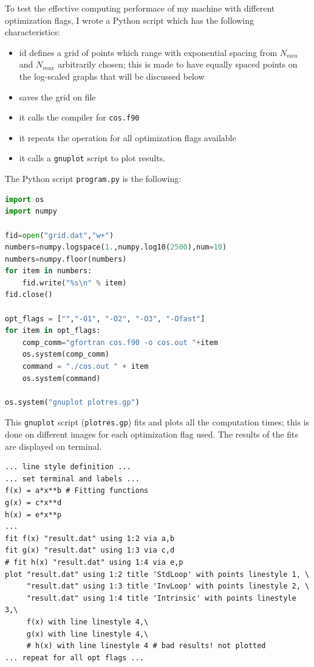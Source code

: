 \documentclass[a4paper]{article}
\begin{document}
\noindent To test the effective computing performace of my machine with different optimization flags, I wrote a Python script which has the following characteristics:
\begin{itemize}
    \item id defines a grid of points which range with exponential spacing from $N_{min}$ and $N_{max}$ arbitrarily chosen; this is made to have equally spaced points on the log-scaled graphs that will be discussed below
    \item saves the grid on file
    \item it calls the compiler for \lstinline{cos.f90}
    \item it repeats the operation for all optimization flags available
    \item it calls a \lstinline{gnuplot} script to plot results.
\end{itemize}
The Python script \lstinline[language=python]{program.py} is the following:
\begin{lstlisting}[language=python]
import os
import numpy

fid=open("grid.dat","w+")
numbers=numpy.logspace(1.,numpy.log10(2500),num=10)
numbers=numpy.floor(numbers)
for item in numbers:
    fid.write("%s\n" % item)
fid.close()

opt_flags = ["","-O1", "-O2", "-O3", "-Ofast"]
for item in opt_flags:
    comp_comm="gfortran cos.f90 -o cos.out "+item
    os.system(comp_comm)
    command = "./cos.out " + item
    os.system(command)

os.system("gnuplot plotres.gp")


\end{lstlisting}
This \lstinline{gnuplot} script (\lstinline{plotres.gp}) fits and plots all the computation times; this is done on different images for each optimization flag used.
The results of the fits are displayed on terminal. 
\begin{verbatim}
... line style definition ...
... set terminal and labels ...
f(x) = a*x**b # Fitting functions
g(x) = c*x**d
h(x) = e*x**p
...
fit f(x) "result.dat" using 1:2 via a,b
fit g(x) "result.dat" using 1:3 via c,d
# fit h(x) "result.dat" using 1:4 via e,p
plot "result.dat" using 1:2 title 'StdLoop' with points linestyle 1, \
     "result.dat" using 1:3 title 'InvLoop' with points linestyle 2, \
     "result.dat" using 1:4 title 'Intrinsic' with points linestyle 3,\
     f(x) with line linestyle 4,\
     g(x) with line linestyle 4,\
     # h(x) with line linestyle 4 # bad results! not plotted
... repeat for all opt flags ...
\end{verbatim}
\end{document}
